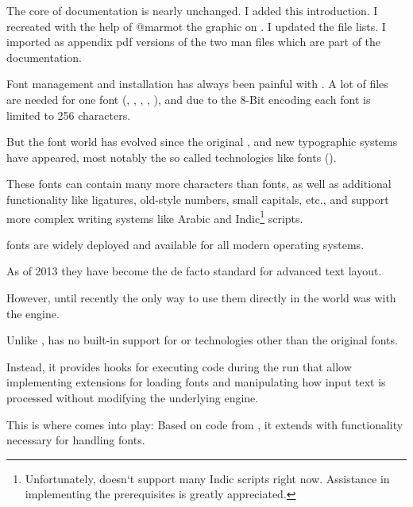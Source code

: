   The core of documentation is nearly unchanged. I added this introduction. I recreated with the help of @marmot the graphic on \pageref{file-graph}. I updated the file lists. I imported as appendix pdf versions of the two man files which are part of the  documentation.
  \endaltitem

\enddescriptions

\endsection

Font management and installation has always been painful with \TEX.  A
lot of files are needed for one font (, ,
, , ), and due to the 8-Bit encoding
each font is limited to 256 characters.

But the font world has evolved since the original \TEX, and new
typographic systems have appeared, most notably the so called
 technologies like \OpenType fonts ().

These fonts can contain many more characters than \TEX fonts, as well
as additional functionality like ligatures, old-style numbers, small
capitals, etc., and support more complex writing systems like Arabic
and Indic\footnote{%
  Unfortunately,  doesn‘t support many Indic
  scripts right now.
  Assistance in implementing the prerequisites is greatly
  appreciated.
}
scripts.

\OpenType fonts are widely deployed and available for all modern
operating systems.

As of 2013 they have become the de facto standard for advanced text
layout.

However, until recently the only way to use them directly in the \TEX
world was with the \XETEX engine.

Unlike \XETEX, \LUATEX has no built-in support for \OpenType or
technologies other than the original \TEX fonts.

Instead, it provides hooks for executing \LUA code during the \TEX run
that allow implementing extensions for loading fonts and manipulating
how input text is processed without modifying the underlying engine.

This is where  comes into play:
Based on code from \CONTEXT, it extends \LUATEX with functionality necessary
for handling \OpenType fonts.

